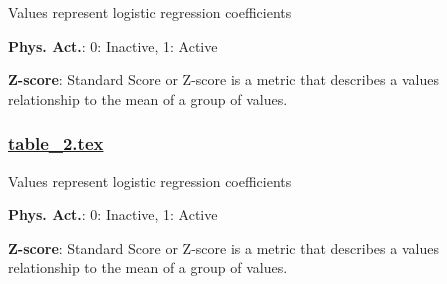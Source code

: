 \documentclass[11pt]{article}
\begin{document}
\begin{codeoutput}
\begin{table}[h]
\caption{Association between physical activity and high blood pressure among diabetics}
\label{table:association_highBP}
\begin{threeparttable}
\renewcommand{\TPTminimum}{\linewidth}
\begin{tablenotes}
\footnotesize
\item Values represent logistic regression coefficients
\item \textbf{Phys. Act.}: 0: Inactive, 1: Active
\item \textbf{Z-score}: Standard Score or Z-score is a metric that describes a values relationship to the mean of a group of values.
\end{tablenotes}
\end{threeparttable}
\end{table}

\end{codeoutput}

\subsubsection*{\hyperlink{code-LaTeX Table Design-table-2-tex}{table\_2.tex}}

\begin{codeoutput}
\begin{table}[h]
\caption{Association between physical activity and high cholesterol among diabetics}
\label{table:association_highChol}
\begin{threeparttable}
\renewcommand{\TPTminimum}{\linewidth}
\begin{tablenotes}
\footnotesize
\item Values represent logistic regression coefficients
\item \textbf{Phys. Act.}: 0: Inactive, 1: Active
\item \textbf{Z-score}: Standard Score or Z-score is a metric that describes a values relationship to the mean of a group of values.
\end{tablenotes}
\end{threeparttable}
\end{table}

\end{codeoutput}
\end{document}
